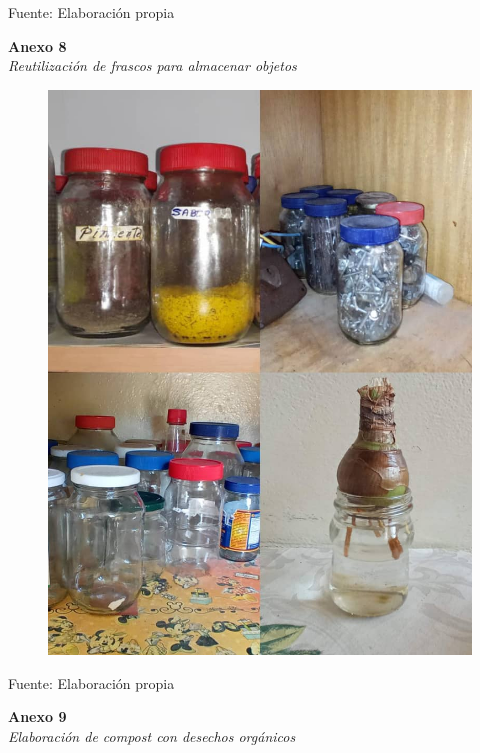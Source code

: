 \setlength{\parindent}{0ex}

Fuente: Elaboración propia

\newpage

\textbf{Anexo 8} \\
\textit{Reutilización de frascos para almacenar objetos}

\begin{figure}[!ht]
    \centering
    \includegraphics[width=15cm]{Media/Fotos/Foto 4 Frascos.jpeg}
    \label{fig:anexo9}
\end{figure}

\setlength{\parindent}{0ex}

Fuente: Elaboración propia

\newpage

\textbf{Anexo 9} \\
\textit{Elaboración de compost con desechos orgánicos}


